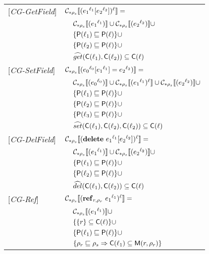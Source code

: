 \newpage
\begin{tabular} {l l l l}
{[\textit{CG-GetField}]}&\multicolumn{3}{l}{$\mathcal{C}_{*\rho_s}\llbracket ({e_1}^{\ell_1}[{e_2}^{\ell_2}])^\ell \rrbracket = $}\\
&&\multicolumn{2}{l}{$ \mathcal{C}_{*\rho_s}\llbracket ({e_1}^{\ell_1}) \rrbracket \cup \mathcal{C}_{*\rho_s}\llbracket ({e_2}^{\ell_2}) \rrbracket \cup$}\\
&&\multicolumn{2}{l}{$\{ \mathsf{P}(\ell_1) \sqsubseteq \mathsf{P}(\ell) \} \cup$} \\
&&\multicolumn{2}{l}{$\{ \mathsf{P}(\ell_2) \sqsubseteq \mathsf{P}(\ell) \} \cup$} \\
&&\multicolumn{2}{l}{$\widehat{get} (\mathsf{C}(\ell_1), \mathsf{C}(\ell_2)) \subseteq \mathsf{C}(\ell)$} \\
{[\textit{CG-SetField}]}&\multicolumn{3}{l}{$\mathcal{C}_{*\rho_s}\llbracket ({e_0}^{\ell_0}[{e_1}^{\ell_1}] = {e_2}^{\ell_2}) \rrbracket = $}\\
&&\multicolumn{2}{l}{$ \mathcal{C}_{*\rho_s}\llbracket ({e_0}^{\ell_0}) \rrbracket \cup \mathcal{C}_{*\rho_s}\llbracket ({e_1}^{\ell_1})^\ell \rrbracket \cup \mathcal{C}_{*\rho_s}\llbracket ({e_2}^{\ell_2}) \rrbracket \cup $}\\
&&\multicolumn{2}{l}{$\{ \mathsf{P}(\ell_1) \sqsubseteq \mathsf{P}(\ell) \} \cup$} \\
&&\multicolumn{2}{l}{$\{ \mathsf{P}(\ell_2) \sqsubseteq \mathsf{P}(\ell) \} \cup$} \\
&&\multicolumn{2}{l}{$\{ \mathsf{P}(\ell_3) \sqsubseteq \mathsf{P}(\ell) \} \cup$} \\
&&\multicolumn{2}{l}{$\widehat{set} (\mathsf{C}(\ell_1), \mathsf{C}(\ell_2), \mathsf{C}(\ell_2)) \subseteq \mathsf{C}(\ell)$} \\
{[\textit{CG-DelField}]}&\multicolumn{3}{l}{$\mathcal{C}_{*\rho_s}\llbracket (\mathbf{delete}\ {e_1}^{\ell_1}[{e_2}^{\ell_2}])^\ell \rrbracket = $}\\ 
&&\multicolumn{2}{l}{$ \mathcal{C}_{*\rho_s}\llbracket ({e_1}^{\ell_1}) \rrbracket \cup \mathcal{C}_{*\rho_s}\llbracket ({e_2}^{\ell_2}) \rrbracket \cup$}\\
&&\multicolumn{2}{l}{$\{ \mathsf{P}(\ell_1) \sqsubseteq \mathsf{P}(\ell) \} \cup$} \\
&&\multicolumn{2}{l}{$\{ \mathsf{P}(\ell_2) \sqsubseteq \mathsf{P}(\ell) \} \cup$} \\
&&\multicolumn{2}{l}{$\widehat{del} (\mathsf{C}(\ell_1), \mathsf{C}(\ell_2)) \subseteq \mathsf{C}(\ell)$}\\
{[\textit{CG-Ref}]}&\multicolumn{3}{l}{$ \mathcal{C}_{*\rho_s}\llbracket (\mathbf{ref}_{r,\rho_r}\ {e_1}^{\ell_1})^\ell \rrbracket = $}\\
&&\multicolumn{2}{l}{$\mathcal{C}_{*\rho_s}\llbracket ({e_1}^{\ell_1}) \rrbracket \cup $}\\
&&\multicolumn{2}{l}{$\{ \{r\} \subseteq \mathsf{C}(\ell) \} \cup$}\\
&&\multicolumn{2}{l}{$\{ \mathsf{P}(\ell_1) \sqsubseteq \mathsf{P}(\ell) \} \cup$}\\
&&\multicolumn{2}{l}{$\{ \rho_r \sqsubseteq \rho_s \Rightarrow \mathsf{C}(\ell_1) \subseteq \mathsf{M}(r, \rho_r) \} $}\\

\end{tabular}
